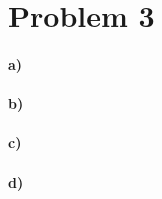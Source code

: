 \documentclass[12pt]{article}
\begin{document}
\section*{Problem 3}

\paragraph{a)}

\paragraph{b)}

\paragraph{c)}

\paragraph{d)}
\end{document}
